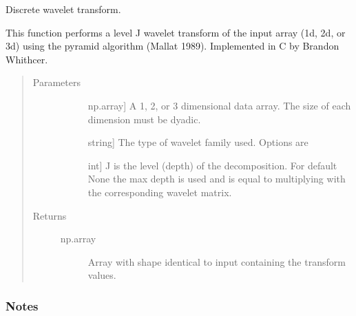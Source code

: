 \documentclass[letterpaper,10pt,english]{sphinxmanual}
\begin{document}
\begin{fulllineitems}
\label{\detokenize{pysmme:pysmme.transforms.wt}}
\sphinxAtStartPar
Discrete wavelet transform.

\sphinxAtStartPar
This function performs a level J wavelet transform of the input array (1d, 2d, or 3d) 
using the pyramid algorithm (Mallat 1989). Implemented in C by Brandon Whithcer.
\begin{quote}\begin{description}
\item[{Parameters}] \leavevmode\begin{description}
\item[{}] \leavevmode{[}np.array{]}
\sphinxAtStartPar
A 1, 2, or 3 dimensional data array. The size of each dimension must be dyadic.

\item[{}] \leavevmode{[}string{]}
\sphinxAtStartPar
The type of wavelet family used. Options are 

\item[{}] \leavevmode{[}int{]}
\sphinxAtStartPar
J is the level (depth) of the decomposition. For default None the max
depth is used and   is equal to multiplying  with the
corresponding wavelet matrix.

\end{description}

\item[{Returns}] \leavevmode\begin{description}
\item[{np.array}] \leavevmode
\sphinxAtStartPar
Array with shape identical to input  containing the transform values.

\end{description}

\end{description}\end{quote}
\subsubsection*{Notes}


\end{fulllineitems}
\end{document}
